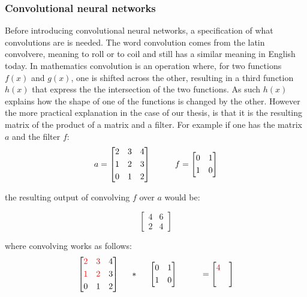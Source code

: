 \subsubsection{Convolutional neural networks}
Before introducing convolutional neural networks, a specification of what convolutions are is needed. The word convolution comes from the latin convolvere, meaning to roll or to coil and still has a similar meaning in English today. In mathematics convolution is an operation where, for two functions $f(x)$ and $g(x)$, one is shifted across the other, resulting in a third function $h(x)$ that express the the intersection of the two functions. As such $h(x)$ explains how the shape of one of the functions is changed by the other. 
However the more practical explanation in the case of our thesis, is that it is the resulting matrix of the product of a matrix and a filter. For example if one has the matrix $a$ and the filter $f$:
\[
a = \begin{bmatrix}
       2 & 3 & 4           \\[0.3em]
       1 & 2 & 3 \\[0.3em]
       0 & 1 & 2
     \end{bmatrix}
\hspace*{1cm}
f = \begin{bmatrix}
       0 & 1 \\[0.3em]
       1 & 0        
     \end{bmatrix}     
\]

\noindent the resulting output of convolving $f$ over $a$ would be:

\[
\begin{bmatrix}
       4 & 6 \\[0.3em]
       2 & 4        
     \end{bmatrix}     
\]

where convolving works as follows:
\[
\begin{bmatrix}
       \textcolor{red}2 & \textcolor{red}3 & 4           \\[0.3em]
       \textcolor{red}1 & \textcolor{red}2 & 3 \\[0.3em]
       0 & 1 & 2
     \end{bmatrix}
\hspace*{0.5cm}
*
\hspace*{0.5cm}
\begin{bmatrix}
       0 & 1 \\[0.3em]
       1 & 0        
     \end{bmatrix}     
\hspace*{1cm}
 = \begin{bmatrix}
       \textcolor{red}4 &  \\[0.3em]
         &         
     \end{bmatrix}
\]

